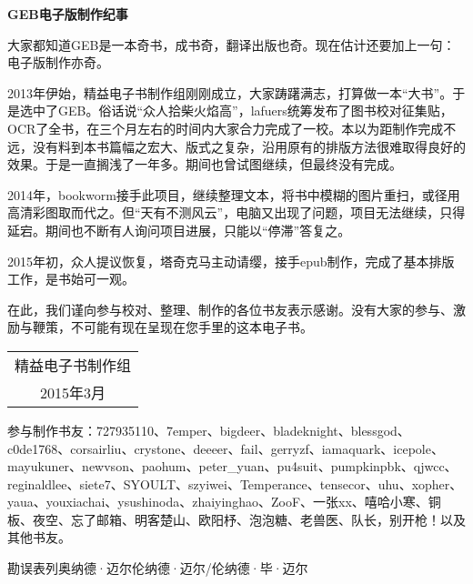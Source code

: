 \begin{center}\bfseries\large
GEB电子版制作纪事
\end{center}

\bigskip

\kaishu\small

大家都知道GEB是一本奇书，成书奇，翻译出版也奇。现在估计还要加上一句：电子版制作亦奇。

2013年伊始，精益电子书制作组刚刚成立，大家踌躇满志，打算做一本“大书”。于是选中了GEB。俗话说“众人拾柴火焰高”，lafuers统筹发布了图书校对征集贴，OCR了全书，在三个月左右的时间内大家合力完成了一校。本以为距制作完成不远，没有料到本书篇幅之宏大、版式之复杂，沿用原有的排版方法很难取得良好的效果。于是一直搁浅了一年多。期间也曾试图继续，但最终没有完成。

2014年，bookworm接手此项目，继续整理文本，将书中模糊的图片重扫，或径用高清彩图取而代之。但“天有不测风云”，电脑又出现了问题，项目无法继续，只得延宕。期间也不断有人询问项目进展，只能以“停滞”答复之。

2015年初，众人提议恢复，塔奇克马主动请缨，接手epub制作，完成了基本排版工作，是书始可一观。

在此，我们谨向参与校对、整理、制作的各位书友表示感谢。没有大家的参与、激励与鞭策，不可能有现在呈现在您手里的这本电子书。

\medskip

\hfill
\begin{tabular}{c@{\qquad}}
精益电子书制作组\\
\small 2015年3月
\end{tabular}

\vfill

\normalfont
\textsf{参与制作书友}：727935110、7emper、bigdeer、bladeknight、blessgod、c0de1768、corsairliu、crystone、deeeer、fail、gerryzf、iamaquark、icepole、mayukuner、newvson、paohum、peter\_yuan、pu4suit、pumpkinpbk、qjwcc、reginaldlee、siete7、SYOULT、szyiwei、Temperance、tensecor、uhu、xopher、yaua、youxiachai、ysushinoda、zhaiyinghao、ZooF、一张xx、嘻哈小寒、铜板、夜空、忘了邮箱、明客楚山、欧阳杼、泡泡糖、老兽医、队长，别开枪！以及其他书友。

\textsf{勘误表}\quad 列奥纳德·迈尔\quad 伦纳德·迈尔/伦纳德·毕·迈尔

\clearpage
\endgroup

